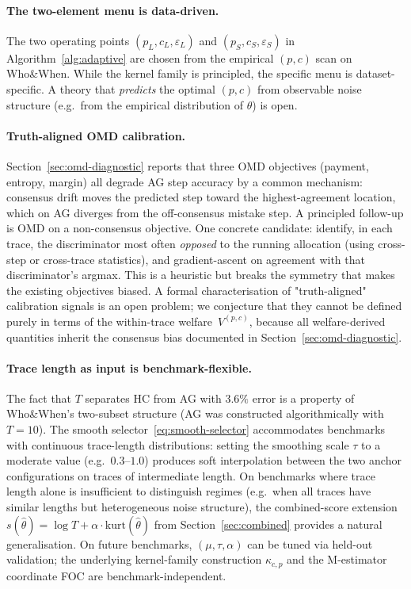 \documentclass[11pt]{article}
\newcommand{\thetahat}{\hat{\theta}}
\begin{document}
\paragraph{The two-element menu is data-driven.}
The two operating points $(p_L, c_L, \varepsilon_L)$ and
$(p_S, c_S, \varepsilon_S)$ in Algorithm~\ref{alg:adaptive} are chosen
from the empirical $(p, c)$ scan on Who\&When. While the kernel family is
principled, the specific menu is dataset-specific. A theory that
\emph{predicts} the optimal $(p, c)$ from observable noise structure
(e.g.\ from the empirical distribution of $\thetahat$) is open.

\paragraph{Truth-aligned OMD calibration.}
Section~\ref{sec:omd-diagnostic} reports that three OMD objectives
(payment, entropy, margin) all degrade AG step accuracy by a common
mechanism: consensus drift moves the predicted step toward the
highest-agreement location, which on AG diverges from the off-consensus
mistake step. A principled follow-up is OMD on a non-consensus objective.
One concrete candidate: identify, in each trace, the discriminator most
often \emph{opposed} to the running allocation (using cross-step or
cross-trace statistics), and gradient-ascent on agreement with that
discriminator's argmax. This is a heuristic but breaks the symmetry that
makes the existing objectives biased. A formal characterisation of
"truth-aligned" calibration signals is an open problem; we conjecture
that they cannot be defined purely in terms of the within-trace
welfare~$V^{(p,c)}$, because all welfare-derived quantities inherit the
consensus bias documented in Section~\ref{sec:omd-diagnostic}.

\paragraph{Trace length as input is benchmark-flexible.}
The fact that $T$ separates HC from AG with $3.6\%$ error is a property
of Who\&When's two-subset structure (AG was constructed algorithmically
with $T = 10$). The smooth selector~\eqref{eq:smooth-selector} accommodates
benchmarks with continuous trace-length distributions: setting the
smoothing scale $\tau$ to a moderate value (e.g.\ $0.3$--$1.0$) produces
soft interpolation between the two anchor configurations on traces of
intermediate length. On benchmarks where trace length alone is insufficient
to distinguish regimes (e.g.\ when all traces have similar lengths but
heterogeneous noise structure), the combined-score extension
$s(\thetahat) = \log T + \alpha \cdot \mathrm{kurt}(\thetahat)$ from
Section~\ref{sec:combined} provides a natural generalisation. On future
benchmarks, $(\mu, \tau, \alpha)$ can be tuned via held-out validation;
the underlying kernel-family construction $\kappa_{c, p}$ and the
M-estimator coordinate FOC are benchmark-independent.
\end{document}
